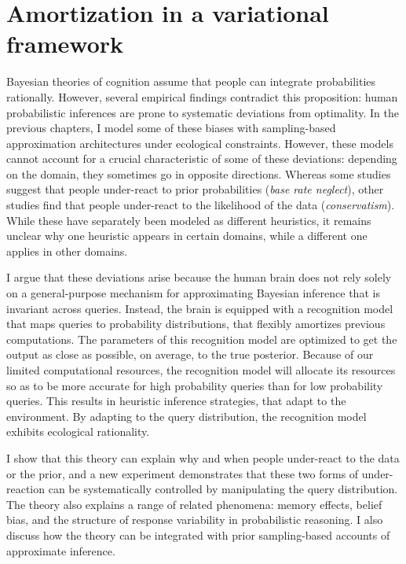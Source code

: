 
\chapter{Amortization in a variational framework}
\label{chap:LTI}

Bayesian theories of cognition assume that people can integrate probabilities rationally. However, several empirical findings contradict this proposition: human probabilistic inferences are prone to systematic deviations from optimality. In the previous chapters, I model some of these biases with sampling-based approximation architectures under ecological constraints. However, these models cannot account for a crucial characteristic of some of these deviations: depending on the domain, they sometimes go in opposite directions. Whereas some studies suggest that people under-react to prior probabilities (\emph{base rate neglect}), other studies find that people under-react to the likelihood of the data (\emph{conservatism}). While these have separately been modeled as different heuristics, it remains unclear why one heuristic appears in certain domains, while a different one applies in other domains.

I argue that these deviations arise because the human brain does not rely solely on a general-purpose mechanism for approximating Bayesian inference that is invariant across queries. Instead, the brain is equipped with a recognition model that maps queries to probability distributions, that flexibly amortizes previous computations. The parameters of this recognition model are optimized to get the output as close as possible, on average, to the true posterior. Because of our limited computational resources, the recognition model will allocate its resources so as to be more accurate for high probability queries than for low probability queries. This results in heuristic inference strategies, that adapt to the environment. By adapting to the query distribution, the recognition model exhibits ecological rationality.

I show that this theory can explain why and when people under-react to the data or the prior, and a new experiment demonstrates that these two forms of under-reaction can be systematically controlled by manipulating the query distribution. The theory also explains a range of related phenomena: memory effects, belief bias, and the structure of response variability in probabilistic reasoning. I also discuss how the theory can be integrated with prior sampling-based accounts of approximate inference.

